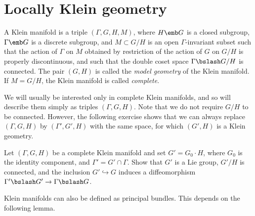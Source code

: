 \section{Locally Klein geometry}\label{sec: locally Klein geom}


\begin{defn}
    A Klein manifold is a triple $(\Gamma,G,H, M)$, where $H\emb G$ is a closed subgroup, $\Gamma\emb G$ is a discrete subgroup, and $M\subset G\slash H$ is an open $\Gamma$-invariant subset such that the action of $\Gamma$ on $M$ obtained by restriction of the action of $G$ on $G\slash H$ is properly discontinuous, and such that the double coset space $\Gamma\bslash G\slash H$ is connected. The pair $(G,H)$ is called the \emph{model geometry} of the Klein manifold. If $M=G\slash H$, the Klein manifold is called \emph{complete}.
\end{defn}

We will usually be interested only in complete Klein manifolds, and so will describe them simply as triples $(\Gamma,G,H)$. Note that we do not require $G\slash H$ to be connected. However, the following exercise shows that we can always replace $(\Gamma,G,H)$ by $(\Gamma',G',H)$ with the same space, for which $(G',H)$ is a Klein geometry.

\begin{xca}
    Let $(\Gamma,G,H)$ be a complete Klein manifold and set $G'=G_0\cdot H$, where $G_0$ is the identity component, and $\Gamma'=G'\cap \Gamma$. Show that $G'$ is a Lie group, $G'\slash H$ is connected, and the inclusion $G'\hookrightarrow G$ induces a diffeomorphism $\Gamma'\bslash G'\to \Gamma\bslash G$.
\end{xca}

Klein manifolds can also be defined as principal bundles. This depends on the following lemma.

